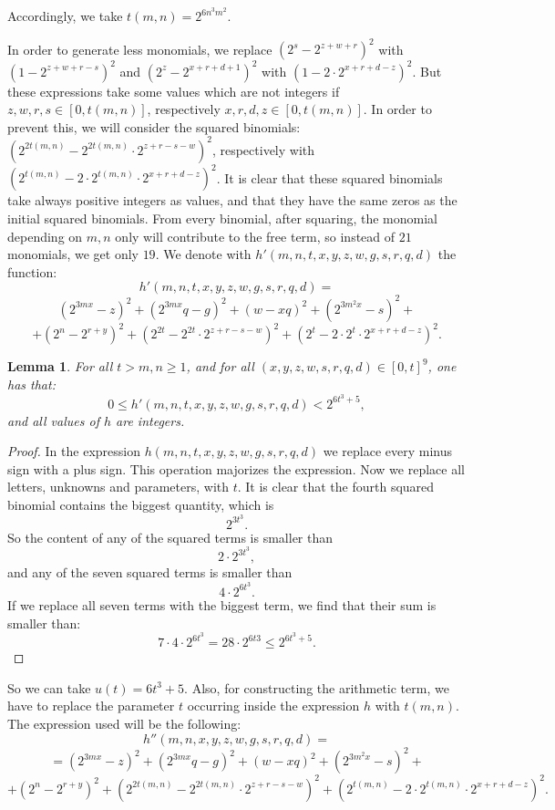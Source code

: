 \documentclass[10pt]{article}
\theoremstyle{plain}
\newtheorem{lemma}{Lemma}[section]
\begin{document}
Accordingly, we take $t(m,n) = 2^{6n^3m^2}. $

In order to generate less monomials, we replace $( 2^s - 2^{z+w+r} )^2$ with $( 1 - 2^{z+w+r-s} )^2$ and $( 2^z - 2^{x + r + d + 1} )^2$ with $( 1 - 2 \cdot 2^{x + r + d - z} )^2$. But these expressions take some values which are not integers if $z, w, r, s \in [0, t(m,n)]$, respectively $x, r, d, z \in [0, t(m,n)]$. In order to prevent this,
we will consider the squared binomials: $( 2^{2t(m,n)} - 2^{2t(m,n)} \cdot 2^{z+r-s-w} )^2$, respectively with $ ( 2^{t(m,n)} - 2 \cdot 2^{t(m,n)} \cdot 2^{x + r + d - z} )^2$. It is clear that these squared binomials take always positive integers as values, and that they have the same zeros as the initial squared binomials. From every binomial, after squaring, the monomial depending on $m, n$ only will contribute to the free term, so instead of $21$ monomials, we get only $19$. We denote with $h'(m,n,t, x,y,z,w,g, s,r,q,d)$ the function:
$$h'(m,n,t, x,y,z,w,g, s,r,q,d) =$$
$$ (2^{3mx} - z)^2 + (2^{3mx} q - g )^2 + (w - xq)^2 + (2^{3m^2x} - s)^2 + $$$$ + (2^n - 2^{r+y})^2 + ( 2^{2t} - 2^{2t} \cdot 2^{z+r-s-w} )^2  + ( 2^{t} - 2 \cdot 2^{t} \cdot 2^{x + r + d - z} )^2.$$


\begin{lemma}
    For all $t > m,n \geq 1$, and for all $(x,y,z,w,s,r,q,d) \in [0, t]^9 $, one has that:
    $$0 \leq h'(m,n,t,x,y,z,w,g, s,r,q,d) < 2^{6t^3 + 5},$$
    and all values of $h$ are integers.
\end{lemma}

\begin{proof}
    In the expression $h(m,n,t,x,y,z,w,g, s,r,q,d)$ we replace every minus sign with a plus sign. This operation majorizes the expression. Now we replace all letters, unknowns and parameters, with $t$. It is clear that the fourth squared binomial contains the biggest quantity, which is
    $$2^{3t^3}.$$
    So the content of any of the squared terms is smaller than
    $$2 \cdot 2^{3t^3}, $$
    and any of the seven squared terms is smaller than
    $$4 \cdot 2^{6t^3}.$$
    If we replace all seven terms with the biggest term, we find that their sum is smaller than:
    $$7 \cdot 4 \cdot 2^{6t^3} = 28 \cdot 2^{6t3} \leq 2^{6t^3 + 5}.$$
\end{proof}

So we can take $u(t) = 6t^3 + 5$. Also, for constructing the arithmetic term, we have to replace the parameter $t$ occurring inside the expression $h$ with $t(m,n)$. The expression used will be the following:
$$h''(m,n,x,y,z,w,g,s,r,q,d) =$$
$$=(2^{3mx} - z)^2 + (2^{3mx} q - g )^2 + (w - xq)^2 + ( 2^{3m^2x} - s)^2 + $$$$ + (2^n - 2^{r+y})^2 + ( 2^{2t(m,n)} - 2^{2t(m,n)} \cdot 2^{z+r-s-w} )^2  + ( 2^{t(m,n)} - 2 \cdot 2^{t(m,n)} \cdot 2^{x + r + d - z} )^2.$$
\end{document}
